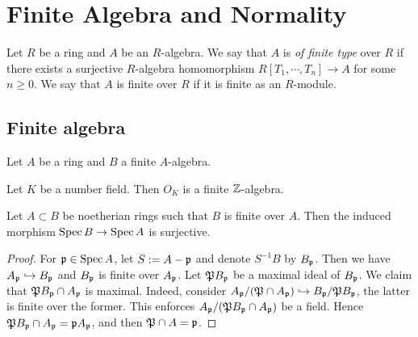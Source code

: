 \section{Finite Algebra and Normality}

Let \(R\) be a ring and \(A\) be an \(R\)-algebra.
We say that \(A\) is \textit{of finite type} over \(R\) if there exists a surjective \(R\)-algebra homomorphism \(R[T_1,\cdots,T_n] \to A\) for some \(n\geq 0\).
We say that \(A\) is finite over \(R\) if it is finite as an \(R\)-module.

\subsection{Finite algebra}

    Let \(A\) be a ring and \(B\) a finite \(A\)-algebra.

    \begin{example}
        Let \(K\) be a number field.
        Then \(O_K\) is a finite \({\mathbb{Z}}\)-algebra.
    \end{example}

    \begin{lemma}\label{lem: finite inclusion induces surjective morphism}
        Let $A \subset B$ be noetherian rings such that $B$ is finite over $A$.
        Then the induced morphism $\operatorname{Spec} B \to \operatorname{Spec} A$ is surjective.
    \end{lemma}
    \begin{proof}
        For ${\mathfrak{p}} \in \operatorname{Spec} A$, let $S:= A-{\mathfrak{p}}$ and denote $S^{-1}B$ by $B_{\mathfrak{p}}$.
        Then we have $A_{\mathfrak{p}} \hookrightarrow B_{\mathfrak{p}}$ and $B_{\mathfrak{p}}$ is finite over $A_{\mathfrak{p}}$.
        Let ${\mathfrak{P}} B_{\mathfrak{p}}$ be a maximal ideal of $B_{\mathfrak{p}}$.
        We claim that ${\mathfrak{P}} B_{\mathfrak{p}} \cap A_{\mathfrak{p}}$ is maximal.
        Indeed, consider $A_{\mathfrak{p}}/({\mathfrak{P}} \cap A_{\mathfrak{p}}) \hookrightarrow B_{\mathfrak{p}}/{\mathfrak{P}} B_{\mathfrak{p}}$, the latter is finite over the former.
        This enforces $A_{\mathfrak{p}}/({\mathfrak{P}} B_{\mathfrak{p}} \cap A_{\mathfrak{p}})$ be a field.
        Hence ${\mathfrak{P}} B_{\mathfrak{p}} \cap A_{\mathfrak{p}} = {\mathfrak{p}} A_{\mathfrak{p}}$, and then ${\mathfrak{P}} \cap A = {\mathfrak{p}}$.
    \end{proof}

